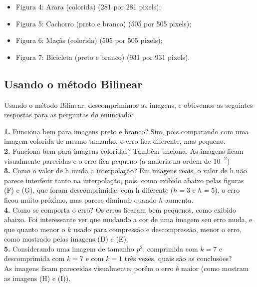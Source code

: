 \documentclass[12pt,letterpaper]{article}
\begin{document}
    \begin{itemize}
        \item Figura 4: Arara (colorida) (281 por 281 pixels);
        \item Figura 5: Cachorro (preto e branco) (505 por 505 pixels);
        \item Figura 6: Maçãs (colorida) (505 por 505 pixels);
        \item Figura 7: Bicicleta (preto e branco) (931 por 931 pixels).
    \end{itemize}

    \subsection{Usando o método Bilinear}

    Usando o método Bilinear, descomprimimos as imagens, e obtivemos as seguintes respostas para as perguntas do enunciado:

    \textbf{1.} Funciona bem para imagens preto e branco?
    Sim, pois comparando com uma imagem colorida de mesmo tamanho, o erro fica diferente, mas pequeno.\\

    \textbf{2.} Funciona bem para imagens coloridas?
    Também unciona. As imagens ficam visualmente parecidas e o erro fica pequeno (a maioria na ordem de $10^{-2}$)\\

    \textbf{3.} Como o valor de h muda a interpolação?
    Em imagens reais, o valor de h não parece interferir tanto na interpolação, pois, como exibido abaixo pelas figuras (F) e (G), que foram descomprimidas com h diferente ($h = 3$ e $h = 5$), o erro ficou muito próximo, mas parece diminuir quando $h$ aumenta.\\

    \textbf{4.} Como se comporta o erro?
    Os erros ficaram bem pequenos, como exibido abaixo. Foi interessante ver que mudando a cor de uma imagem seu erro muda, e que quanto menor o $k$ usado para compressão e descompressão, menor o erro, como mostrado pelas imagens (D) e (E). \\

    \textbf{5.} Considerando uma imagem de tamanho $p^2$, comprimida com $k = 7$ e descomprimida com $k = 7$ e com $k = 1$ três vezes, quais são as conclusões?\\
    As imagens ficam pareceidas visualmente, porém o erro é maior (como mostram as imagens (H) e (I)).
\end{document}
